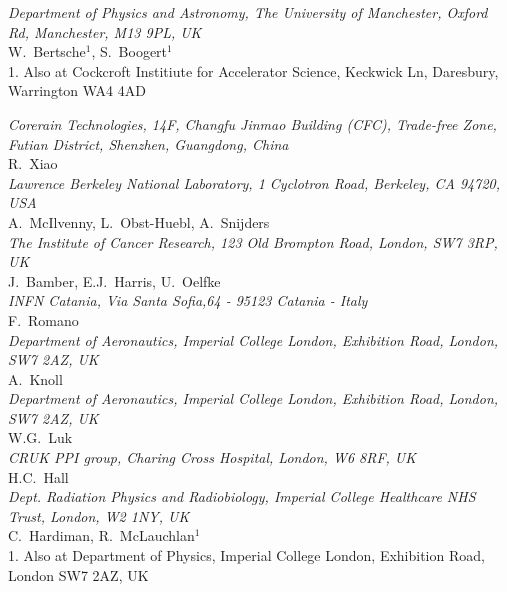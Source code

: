 \noindent \textit{Department of Physics and Astronomy, The University of Manchester, Oxford Rd, Manchester, M13 9PL, UK} \\
W.~Bertsche$^{1}$, S.~Boogert$^{1}$ \\
{\footnotesize
  1. Also at Cockcroft Institiute for Accelerator Science, Keckwick Ln, Daresbury, Warrington WA4 4AD \\
}
 
\noindent \textit{Corerain Technologies, 14F, Changfu Jinmao Building (CFC), Trade-free Zone, Futian District, Shenzhen, Guangdong, China} \\
R.~Xiao \\
 
\noindent \textit{Lawrence Berkeley National Laboratory, 1 Cyclotron Road, Berkeley, CA 94720, USA} \\
A.~McIlvenny, L.~Obst-Huebl, A.~Snijders \\
 
\noindent \textit{The Institute of Cancer Research, 123 Old Brompton Road, London, SW7 3RP, UK} \\
J.~Bamber, E.J.~Harris, U.~Oelfke \\
 
\noindent \textit{INFN Catania, Via Santa Sofia,64 - 95123 Catania - Italy} \\
F.~Romano \\
 
\noindent \textit{Department of Aeronautics, Imperial College London, Exhibition Road, London, SW7 2AZ, UK} \\
A.~Knoll \\
 
\noindent \textit{Department of Aeronautics, Imperial College London, Exhibition Road, London, SW7 2AZ, UK} \\
W.G.~Luk \\
 
\noindent \textit{CRUK PPI group, Charing Cross Hospital, London, W6 8RF, UK} \\
H.C.~Hall \\
 
\noindent \textit{Dept. Radiation Physics and Radiobiology, Imperial College Healthcare NHS Trust, London, W2 1NY, UK} \\
C.~Hardiman, R.~McLauchlan$^{1}$ \\
{\footnotesize
  1. Also at Department of Physics, Imperial College London, Exhibition Road, London SW7 2AZ, UK \\
}
 
